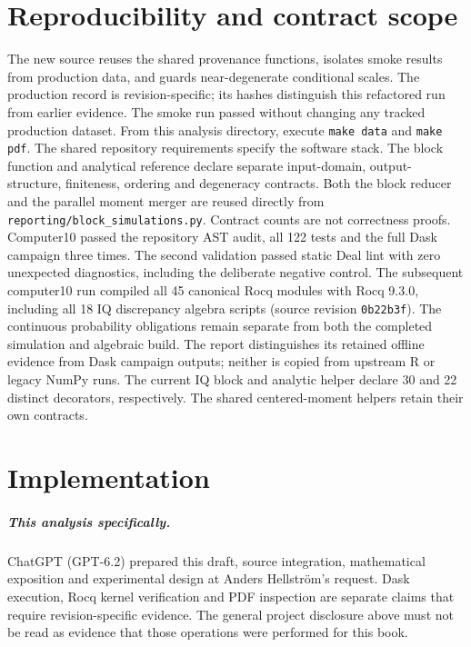 \chapter{Reproducibility and contract scope}
The new source reuses the shared provenance functions, isolates
smoke results from production data, and guards near-degenerate conditional
scales. The production record is revision-specific; its hashes distinguish
this refactored run from earlier evidence. The smoke run passed without
changing any tracked production dataset.
From this analysis directory, execute \texttt{make data} and
\texttt{make pdf}. The shared repository requirements specify the software
stack. The block function and analytical reference declare separate input-domain,
output-structure, finiteness, ordering and degeneracy contracts. Both the
block reducer and the parallel moment merger are reused directly from
\texttt{reporting/block\_simulations.py}.
Contract counts are not correctness proofs. Computer10 passed the repository AST audit, all 122 tests and the full
Dask campaign three times. The second validation passed static Deal lint with
zero unexpected diagnostics, including the deliberate negative control.
The subsequent computer10 run compiled all 45 canonical Rocq modules
with Rocq 9.3.0, including all 18 IQ discrepancy algebra scripts
(source revision \texttt{0b22b3f}). The continuous probability obligations
remain separate from both the completed simulation and algebraic build. The report distinguishes its retained offline evidence from Dask campaign
outputs; neither is copied from upstream R or legacy NumPy runs. The current
IQ block and analytic helper declare 30 and 22 distinct decorators,
respectively. The shared centered-moment helpers retain their own contracts.


\appendix
\chapter{Implementation}

\ProjectReportAIAppendix
\paragraph{This analysis specifically.} ChatGPT (GPT-6.2) prepared this draft, source integration, mathematical exposition and experimental design at Anders Hellström's request. Dask execution, Rocq kernel verification and PDF inspection are separate claims that require revision-specific evidence. The general project disclosure above must not be read as evidence that those operations were performed for this book.

